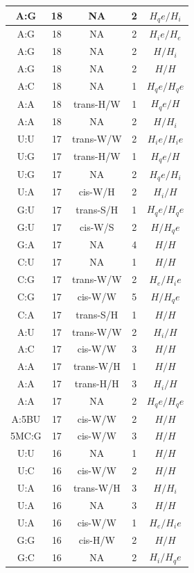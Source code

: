 \begin{center}
\begin{longtable}{c|c|c|c|c}
A:G & 18 & NA & 2 & $H_qe/H_i$ \\  \hline
A:G & 18 & NA & 2 & $H_ie/H_e$ \\  \hline
A:G & 18 & NA & 2 & $H/H_i$ \\  \hline
A:G & 18 & NA & 2 & $H/H$ \\  \hline
A:C & 18 & NA & 1 & $H_qe/H_qe$ \\  \hline
A:A & 18 & trans-H/W & 1 & $H_qe/H$ \\  \hline
A:A & 18 & NA & 2 & $H/H_i$ \\  \hline
U:U & 17 & trans-W/W & 2 & $H_ie/H_ie$ \\  \hline
U:G & 17 & trans-H/W & 1 & $H_qe/H$ \\  \hline
U:G & 17 & NA & 2 & $H_qe/H_i$ \\  \hline
U:A & 17 & cis-W/H & 2 & $H_i/H$ \\  \hline
G:U & 17 & trans-S/H & 1 & $H_qe/H_qe$ \\  \hline
G:U & 17 & cis-W/S & 2 & $H/H_qe$ \\  \hline
G:A & 17 & NA & 4 & $H/H$ \\  \hline
C:U & 17 & NA & 1 & $H/H$ \\  \hline
C:G & 17 & trans-W/W & 2 & $H_e/H_ie$ \\  \hline
C:G & 17 & cis-W/W & 5 & $H/H_qe$ \\  \hline
C:A & 17 & trans-S/H & 1 & $H/H$ \\  \hline
A:U & 17 & trans-W/W & 2 & $H_i/H$ \\  \hline
A:C & 17 & cis-W/W & 3 & $H/H$ \\  \hline
A:A & 17 & trans-W/H & 1 & $H/H$ \\  \hline
A:A & 17 & trans-H/H & 3 & $H_i/H$ \\  \hline
A:A & 17 & NA & 2 & $H_qe/H_qe$ \\  \hline
A:5BU & 17 & cis-W/W & 2 & $H/H$ \\  \hline
5MC:G & 17 & cis-W/W & 3 & $H/H$ \\  \hline
U:U & 16 & NA & 1 & $H/H$ \\  \hline
U:C & 16 & cis-W/W & 2 & $H/H$ \\  \hline
U:A & 16 & trans-W/H & 3 & $H/H_i$ \\  \hline
U:A & 16 & NA & 3 & $H/H$ \\  \hline
U:A & 16 & cis-W/W & 1 & $H_e/H_ie$ \\  \hline
G:G & 16 & cis-H/W & 2 & $H/H$ \\  \hline
G:C & 16 & NA & 2 & $H_i/H_qe$ \\  \hline

\end{longtable}
\end{center}
